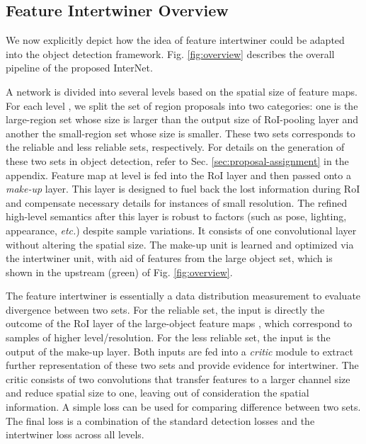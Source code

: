 \documentclass{article} \usepackage{iclr2019_conference,times}
\begin{document}
\subsection{Feature Intertwiner Overview}\label{sec:turbo-boost-module}

We now explicitly depict how the idea of feature intertwiner could be adapted into the object detection framework.
Fig. \ref{fig:overview} describes the overall pipeline of the proposed InterNet.


A network is divided into several levels based on the spatial size of feature maps. For each level , 
we split the set of region proposals 
into two categories: one is the large-region set whose size is larger than the output size of RoI-pooling layer and another the small-region set whose size is smaller. These two sets corresponds to the reliable and less reliable sets, respectively. For details on the generation of these two sets in object detection, refer to Sec. \ref{sec:proposal-assignment} in the appendix.
Feature map  at level  is fed into the RoI layer and then passed onto a \textit{make-up} layer. This layer is designed to fuel back the lost information during RoI and compensate necessary details for instances of small resolution.
The refined high-level semantics after this layer is robust to factors (such as pose, lighting, appearance, \textit{etc.}) despite sample variations.
It consists of one convolutional layer without altering the spatial size. The make-up unit is learned and optimized via the intertwiner unit, with aid of features from the large object set, which is shown in the upstream (green) of Fig. \ref{fig:overview}.


The feature intertwiner is essentially a data distribution measurement to evaluate divergence between two sets. For the reliable set, the input is directly the outcome of the RoI layer of the large-object feature maps , which correspond to samples of higher level/resolution.
For the less reliable set, the input is the output of the make-up layer.
Both inputs are fed into a \textit{critic} module
to extract further representation of these two sets and provide evidence for intertwiner. 
The critic consists of two convolutions that transfer features to a larger channel size 
and reduce spatial size to one, leaving out of consideration the spatial information.
A simple  loss can be used for comparing difference between two sets.
The final loss is a combination of the standard detection losses \citep{ross15_fast_rcnn} and the intertwiner loss across all levels.
\end{document}
